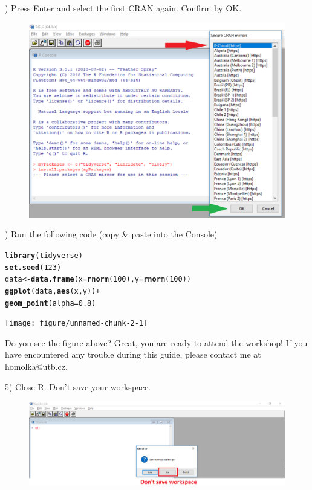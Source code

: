 \documentclass{article}\usepackage[]{graphicx}\usepackage[]{color}
\makeatletter
\newcommand{\hlnum}[1]{\textcolor[rgb]{0.686,0.059,0.569}{#1}}%
\newcommand{\hlopt}[1]{\textcolor[rgb]{0,0,0}{#1}}%
\newcommand{\hlstd}[1]{\textcolor[rgb]{0.345,0.345,0.345}{#1}}%
\newcommand{\hlkwb}[1]{\textcolor[rgb]{0.69,0.353,0.396}{#1}}%
\newcommand{\hlkwc}[1]{\textcolor[rgb]{0.333,0.667,0.333}{#1}}%
\newcommand{\hlkwd}[1]{\textcolor[rgb]{0.737,0.353,0.396}{\textbf{#1}}}%
\newenvironment{kframe}{%
 \def\at@end@of@kframe{}%
 \ifinner\ifhmode%
  \def\at@end@of@kframe{\end{minipage}}%
  \begin{minipage}{\columnwidth}%
 \fi\fi%
 \def\FrameCommand##1{\hskip\@totalleftmargin \hskip-\fboxsep
 \colorbox{shadecolor}{##1}\hskip-\fboxsep
     \hskip-\linewidth \hskip-\@totalleftmargin \hskip\columnwidth}%
 \MakeFramed {\advance\hsize-\width
   \@totalleftmargin\z@ \linewidth\hsize
   \@setminipage}}%
 {\par\unskip\endMakeFramed%
 \at@end@of@kframe}
\newenvironment{knitrout}{}{} %
\makeatother
\begin{document}
) Press Enter and select the first CRAN again. Confirm by OK.

\begin{figure}[!h]
 \includegraphics[width=\textwidth,height=\textheight,keepaspectratio]{./Images/image_08.png}
\end{figure} 

) Run the following code (copy \& paste into the Console)
\begin{knitrout}
\color{fgcolor}\begin{kframe}
\begin{alltt}
\hlkwd{library}\hlstd{(tidyverse)}
\hlkwd{set.seed}\hlstd{(}\hlnum{123}\hlstd{)}
\hlstd{data} \hlkwb{<-} \hlkwd{data.frame}\hlstd{(}\hlkwc{x}\hlstd{=}\hlkwd{rnorm}\hlstd{(}\hlnum{100}\hlstd{),} \hlkwc{y}\hlstd{=}\hlkwd{rnorm}\hlstd{(}\hlnum{100}\hlstd{))}
\hlkwd{ggplot}\hlstd{(data,} \hlkwd{aes}\hlstd{(x,y) )} \hlopt{+}
 \hlkwd{geom_point}\hlstd{(}\hlkwc{alpha}\hlstd{=}\hlnum{0.8}\hlstd{)}
\end{alltt}
\end{kframe}
\texttt{[image: figure/unnamed-chunk-2-1]} 

\end{knitrout}

Do you see the figure above? Great, you are ready to attend the workshop! If you have encountered any trouble during this guide, please contact me at {\color{blue} homolka@utb.cz}. \bigskip

5) Close R. Don't save your workspace.

\begin{figure}[!h]
 \includegraphics[width=\textwidth,height=\textheight,keepaspectratio]{./Images/image_09.png}
\end{figure}
\end{document}
